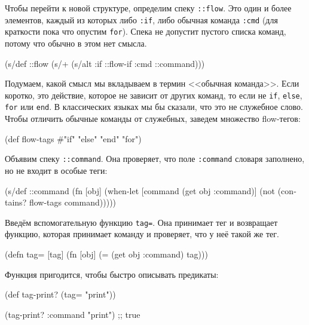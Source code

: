 Чтобы перейти к новой структуре, определим спеку \texttt{::flow}. Это один и
более элементов, каждый из которых либо \texttt{:if}, либо обычная команда
\texttt{:cmd} (для краткости пока что опустим \texttt{for}). Спека не допустит
пустого списка команд, потому что обычно в этом нет смысла.

\begin{english}
  \begin{clojure}
(s/def ::flow
  (s/+ (s/alt :if ::flow-if
              :cmd ::command)))
  \end{clojure}
\end{english}

Подумаем, какой смысл мы вкладываем в термин <<обычная команда>>. Если коротко,
это действие, которое не зависит от других команд, то если не \texttt{if},
\texttt{else}, \texttt{for} или \texttt{end}. В классических языках мы бы
сказали, что это не служебное слово. Чтобы отличить обычные команды от служебных,
заведем множество flow-тегов:

\label{flow-tags}

\begin{english}
  \begin{clojure}
(def flow-tags #{"if" "else" "end" "for"})
  \end{clojure}
\end{english}

Объявим спеку \texttt{::command}. Она проверяет, что поле \texttt{:command}
словаря заполнено, но не входит в особые теги:

\begin{english}
  \begin{clojure}
(s/def ::command
  (fn [obj]
    (when-let [command (get obj :command)]
      (not (contains? flow-tags command)))))
  \end{clojure}
\end{english}

Введём вспомогательную функцию \texttt{tag=}. Она принимает тег и возвращает
функцию, которая принимает команду и проверяет, что у неё такой же тег.

\begin{english}
  \begin{clojure}
(defn tag= [tag]
  (fn [obj]
    (= (get obj :command) tag)))
  \end{clojure}
\end{english}

Функция пригодится, чтобы быстро описывать предикаты:

\begin{english}
  \begin{clojure}
(def tag-print? (tag= "print"))

(tag-print? {:command "print"})
;; true
  \end{clojure}
\end{english}

